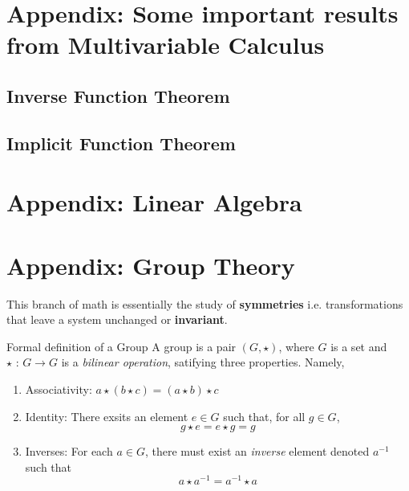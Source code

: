 \documentclass[11pt]{article}
\begin{document}
\newpage
\section{Appendix: Some important results from Multivariable Calculus}

\subsection{Inverse Function Theorem}


\subsection{Implicit Function Theorem}

\vskip 1cm



\newpage
\section{Appendix: Linear Algebra}



\newpage
\section{Appendix: Group Theory}


\vskip 0.5cm
This branch of math is essentially the study of \textbf{symmetries} i.e. transformations that leave a system unchanged or \textbf{invariant}.

\vskip 0.5cm
\begin{mathdefinitionbox}{Formal definition of a Group}
  \vskip 0.5cm
  A group is a pair $(G, \star)$, where $G$ is a set and $\star \text{ : } G \rightarrow G$ is a \emph{bilinear operation}, satifying three properties. Namely, 
  \begin{enumerate}[label=(\alph*)]
    \item Associativity: $a \star ( b \star c) = (a \star b) \star c$ 
    
    \item Identity: There exsits an element $e \in G$ such that, for all $g \in G$,
    \[ g \star e = e \star g = g \]

    \item Inverses: For each $a \in G$, there must exist an \emph{inverse} element denoted $a^{-1}$ such that 
    \[ a \star a^{-1} = a^{-1} \star a \]
  \end{enumerate}
\end{mathdefinitionbox}
\end{document}
